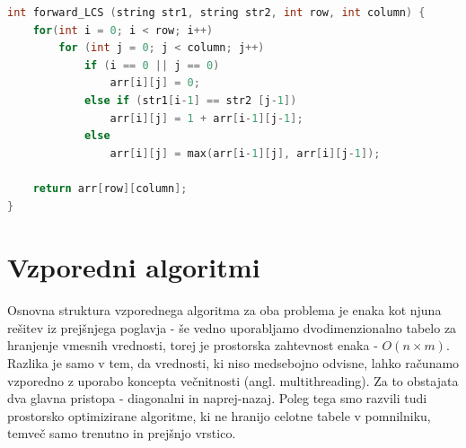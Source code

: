 \documentclass[a4paper,12pt,openright]{book}
\begin{document}
\bigskip \bigskip

\begin{lstlisting}[language=C++, caption={Algoritem za izračun LCS}, captionpos=b, label=LCSnaprej]
int forward_LCS (string str1, string str2, int row, int column) {
    for(int i = 0; i < row; i++) 
        for (int j = 0; j < column; j++) 
            if (i == 0 || j == 0)
                arr[i][j] = 0;
            else if (str1[i-1] == str2 [j-1])
                arr[i][j] = 1 + arr[i-1][j-1];
            else
                arr[i][j] = max(arr[i-1][j], arr[i][j-1]);

    return arr[row][column];
}
\end{lstlisting}

\chapter{Vzporedni algoritmi}

Osnovna struktura vzporednega algoritma za oba problema je enaka kot njuna rešitev iz prejšnjega poglavja - še vedno uporabljamo dvodimenzionalno tabelo za hranjenje vmesnih vrednosti, torej je prostorska zahtevnost enaka - $O(n \times m)$. Razlika je samo v tem, da vrednosti, ki niso medsebojno odvisne, lahko računamo vzporedno z uporabo koncepta večnitnosti (angl. multithreading). Za to obstajata dva glavna pristopa - diagonalni in naprej-nazaj. Poleg tega smo razvili tudi prostorsko optimizirane algoritme, ki ne hranijo celotne tabele v pomnilniku, temveč samo trenutno in prejšnjo vrstico. 
\end{document}
